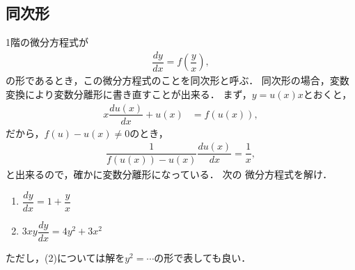 \subsection{同次形}
%
1階の微分方程式が
\begin{align}
  \dfrac{dy}{dx} = f\left(\dfrac{y}{x}\right),
\end{align}
の形であるとき，この微分方程式のことを同次形と呼ぶ．
同次形の場合，変数変換により変数分離形に書き直すことが出来る．
まず，$y=u\left(x\right)x$とおくと，
\begin{align}
 x\dfrac{du\left(x\right)}{dx}+u\left(x\right) & =f\left(u\left(x\right)\right),
\end{align}
だから，$f\left(u\right) - u\left(x\right) \neq 0$のとき，
\begin{align}
 \dfrac{1}{f\left(u\left(x\right)\right)-u\left(x\right)}\dfrac{du\left(x\right)}{dx}=\dfrac{1}{x},
\end{align}
と出来るので，確かに変数分離形になっている．
%
\newpage
%
\gl
\reidai
次の
微分方程式を解け．
\begin{enumerate}[(1)]
  \item $\dfrac{dy}{dx} = 1 + \dfrac{y}{x} $
  \item $3xy\dfrac{dy}{dx} = 4y^2 + 3x^2$ 
\end{enumerate}
ただし，(2)については解を$y^2 = \cdots$の形で表しても良い．
\gl

